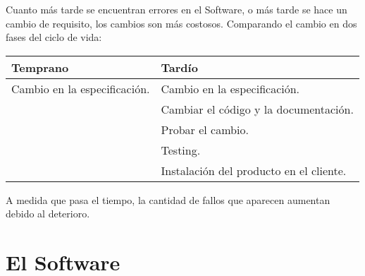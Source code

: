 \begin{figure}[h]
  \label{fig:costemetodologia}
\end{figure}

Cuanto más tarde se encuentran errores en el Software, o más tarde se
hace un cambio de requisito, los cambios son más costosos. Comparando
el cambio en dos fases del ciclo de vida:

\begin{center}
\begin{tabular}{p{5cm} | p{7cm}}
  \textbf{Temprano} &   \textbf{Tardío} \\ \hline
  Cambio en la especificación. & Cambio en la especificación. \\
                    & Cambiar el código y la documentación. \\
                    & Probar el cambio. \\
                    & Testing. \\
                    & Instalación del producto en el cliente.
                                           
\end{tabular}  
\end{center}

A medida que pasa el tiempo, la cantidad de fallos que aparecen
aumentan debido al deterioro.

\section{El Software}
\label{sec:software}

